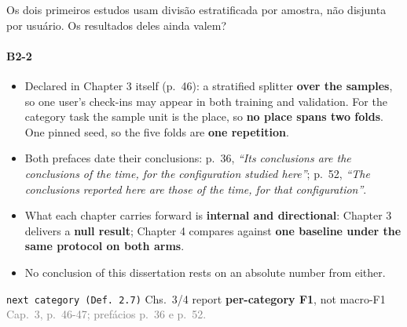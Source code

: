 \documentclass{beamer}
\begin{document}
\begin{frame}[noframenumbering]{Os dois primeiros estudos usam divisão estratificada por amostra, não disjunta por usuário. Os resultados deles ainda valem?}
    \framesubtitle{B2-2}
    \hypertarget{b22}{}
    \small
    \begin{itemize}\setlength{\itemsep}{0pt}\setlength{\parskip}{0pt}
        \item Declared in Chapter 3 itself (p.~46): a stratified splitter \textbf{over the samples}, so one user's check-ins may appear in both training and validation. For the category task the sample unit is the place, so \textbf{no place spans two folds}. One pinned seed, so the five folds are \textbf{one repetition}.
        \item Both prefaces date their conclusions: p.~36, \textit{``Its conclusions are the conclusions of the time, for the configuration studied here''}; p.~52, \textit{``The conclusions reported here are those of the time, for that configuration''}.
        \item What each chapter carries forward is \textbf{internal and directional}: Chapter 3 delivers a \textbf{null result}; Chapter 4 compares against \textbf{one baseline under the same protocol on both arms}.
        \item No conclusion of this dissertation rests on an absolute number from either.
    \end{itemize}
    \vfill
    {\scriptsize\texttt{next category (Def.~2.7)} \textbullet{} Chs.~3/4 report \textbf{per-category F1}, not macro-F1 \textbullet{} \textcolor{gray}{Cap.~3, p.~46-47; prefácios p.~36 e p.~52.}\hfill\hyperlink{b0}{}}
\end{frame}
\end{document}
